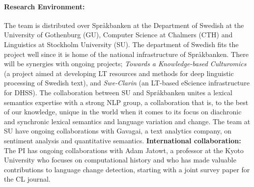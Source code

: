\documentclass[12pt,twoside,a4paper]{article}
\begin{document}
    \paragraph{Research Environment:} The team is distributed over Språkbanken at the Department of Swe\-d\-ish at the University of Gothenburg (GU), Computer Science at Chalmers (CTH) and Linguistics at Stockholm University (SU). The department of Swedish fits the project well since it is home of the national infrastructure of Språkbanken. There will be synergies with ongoing projects; \textit{Towards a Knowledge-based Culturomics} (a project aimed at developing LT resources and methods for deep linguistic processing of Swedish text), and \textit{Swe-Clarin} (an LT-based eScience infrastructure for DHSS). %
    The collaboration between SU and Språkbanken unites a lexical semantics expertise with a strong NLP group, a collaboration that is, to the best of our knowledge, unique in the world when it comes to its focus on diachronic and synchronic lexical semantics and language variation and change.
	The team at SU have ongoing collaborations with Gavagai, a text analytics company, on sentiment analysis and quantitative semantics. 
\textbf{International collaboration:}
	The PI has ongoing collaborations with Adam Jatowt, a professor at the Kyoto University who focuses on computational history and who has made valuable contributions to language change detection, starting with a joint survey paper for the CL journal. 

\vspace{-0.35cm}	
\end{document}
